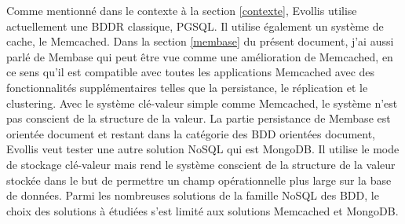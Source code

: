 Comme mentionné dans le contexte à la section \ref{contexte}, \textsf{Evollis} utilise actuellement une
\textsf{BDDR} classique, \textsf{PGSQL}. Il utilise également un système de cache, le \textsf{Memcached}. Dans la section \ref{membase} du présent document, j'ai aussi parlé de \textsf{Membase} qui peut être vue comme une amélioration
de \textsf{Memcached}, en ce sens qu'il est compatible avec toutes les applications \textsf{Memcached} avec des fonctionnalités
supplémentaires telles que la persistance, le réplication et le clustering.  
Avec le système clé-valeur simple comme \textsf{Memcached}, le système n'est pas conscient de la structure de la valeur. 
La partie persistance de \textsf{Membase} est orientée document et restant dans la catégorie des \textsf{BDD} orientées document,  
\textsf{Evollis} veut tester une autre solution \textsf{NoSQL} qui est \textsf{MongoDB}. Il utilise le mode de stockage clé-valeur
mais rend le système conscient de la structure de la valeur stockée dans le but de permettre un champ
opérationnelle plus large sur la base de données. Parmi les nombreuses solutions de la famille \textsf{NoSQL} des \textsf{BDD}, le choix des solutions à étudiées s'est limité aux solutions \textsf{Memcached} et \textsf{MongoDB}.
